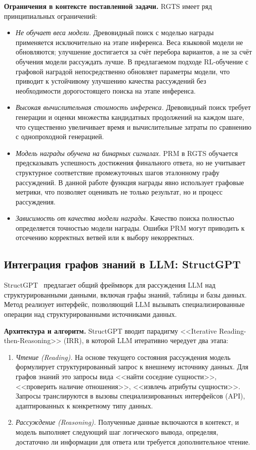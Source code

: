 \textbf{Ограничения в контексте поставленной задачи.}
RGTS имеет ряд принципиальных ограничений:
\begin{itemize}
    \item \textit{Не обучает веса модели.} Древовидный поиск с моделью награды применяется исключительно на этапе инференса. Веса языковой модели не обновляются; улучшение достигается за счёт перебора вариантов, а не за счёт обучения модели рассуждать лучше. В предлагаемом подходе RL-обучение с графовой наградой непосредственно обновляет параметры модели, что приводит к устойчивому улучшению качества рассуждений без необходимости дорогостоящего поиска на этапе инференса.
    \item \textit{Высокая вычислительная стоимость инференса.} Древовидный поиск требует генерации и оценки множества кандидатных продолжений на каждом шаге, что существенно увеличивает время и вычислительные затраты по сравнению с однопроходной генерацией.
    \item \textit{Модель награды обучена на бинарных сигналах.} PRM в RGTS обучается предсказывать успешность достижения финального ответа, но не учитывает структурное соответствие промежуточных шагов эталонному графу рассуждений. В данной работе функция награды явно использует графовые метрики, что позволяет оценивать не только результат, но и процесс рассуждения.
    \item \textit{Зависимость от качества модели награды.} Качество поиска полностью определяется точностью модели награды. Ошибки PRM могут приводить к отсечению корректных ветвей или к выбору некорректных.
\end{itemize}

\subsection{Интеграция графов знаний в LLM: StructGPT}
\label{subsec:structgpt}

StructGPT~\cite{jiang2023structgpt} предлагает общий фреймворк для рассуждения LLM над структурированными данными, включая графы знаний, таблицы и базы данных. Метод реализует интерфейс, позволяющий LLM вызывать специализированные операции над структурированными источниками данных.

\textbf{Архитектура и алгоритм.}
StructGPT вводит парадигму <<Iterative Reading-then-Reasoning>> (IRR), в которой LLM итеративно чередует два этапа:
\begin{enumerate}
    \item \textit{Чтение (Reading).} На основе текущего состояния рассуждения модель формулирует структурированный запрос к внешнему источнику данных. Для графов знаний это запросы вида <<найти соседние сущности>>, <<проверить наличие отношения>>, <<извлечь атрибуты сущности>>. Запросы транслируются в вызовы специализированных интерфейсов (API), адаптированных к конкретному типу данных.
    \item \textit{Рассуждение (Reasoning).} Полученные данные включаются в контекст, и модель выполняет следующий шаг логического вывода, определяя, достаточно ли информации для ответа или требуется дополнительное чтение.
\end{enumerate}

